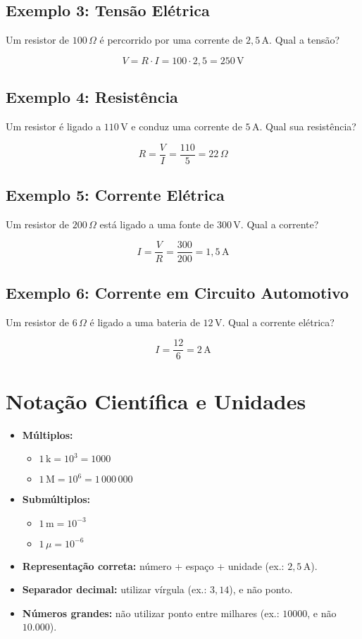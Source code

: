 \subsection*{Exemplo 3: Tensão Elétrica}
Um resistor de $100\,\Omega$ é percorrido por uma corrente de $2{,}5\,\text{A}$. Qual a tensão?

\[
V = R \cdot I = 100 \cdot 2{,}5 = 250\,\text{V}
\]

\subsection*{Exemplo 4: Resistência}
Um resistor é ligado a $110\,\text{V}$ e conduz uma corrente de $5\,\text{A}$. Qual sua resistência?

\[
R = \frac{V}{I} = \frac{110}{5} = 22\,\Omega
\]

\subsection*{Exemplo 5: Corrente Elétrica}
Um resistor de $200\,\Omega$ está ligado a uma fonte de $300\,\text{V}$. Qual a corrente?

\[
I = \frac{V}{R} = \frac{300}{200} = 1{,}5\,\text{A}
\]

\subsection*{Exemplo 6: Corrente em Circuito Automotivo}
Um resistor de $6\,\Omega$ é ligado a uma bateria de $12\,\text{V}$. Qual a corrente elétrica?

\[
I = \frac{12}{6} = 2\,\text{A}
\]

\section{Notação Científica e Unidades}

\begin{itemize}
    \item \textbf{Múltiplos:} 
        \begin{itemize}
            \item $1\,\text{k} = 10^3 = 1000$
            \item $1\,\text{M} = 10^6 = 1\,000\,000$
        \end{itemize}
    \item \textbf{Submúltiplos:}
        \begin{itemize}
            \item $1\,\text{m} = 10^{-3}$
            \item $1\,\mu = 10^{-6}$
        \end{itemize}
    \item \textbf{Representação correta:} número + espaço + unidade (ex.: $2{,}5\,\text{A}$).
    \item \textbf{Separador decimal:} utilizar vírgula (ex.: $3{,}14$), e não ponto.
    \item \textbf{Números grandes:} não utilizar ponto entre milhares (ex.: $10000$, e não $10.000$).
\end{itemize}

